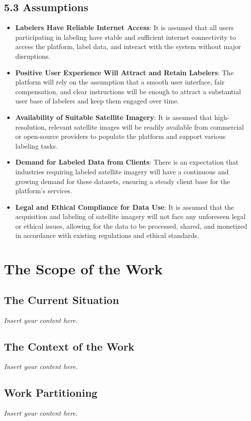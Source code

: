 \documentclass[12pt]{article}
\newcommand{\lips}{\textit{Insert your content here.}}
\begin{document}
\subsection*{5.3 Assumptions}
\begin{itemize}
    \item \textbf{Labelers Have Reliable Internet Access}: It is assumed that all users participating in labeling have stable and sufficient internet connectivity to access the platform, label data, and interact with the system without major disruptions.
    \item \textbf{Positive User Experience Will Attract and Retain Labelers}: The platform will rely on the assumption that a smooth user interface, fair compensation, and clear instructions will be enough to attract a substantial user base of labelers and keep them engaged over time.
    \item \textbf{Availability of Suitable Satellite Imagery}: It is assumed that high-resolution, relevant satellite images will be readily available from commercial or open-source providers to populate the platform and support various labeling tasks.
    \item \textbf{Demand for Labeled Data from Clients}: There is an expectation that industries requiring labeled satellite imagery will have a continuous and growing demand for these datasets, ensuring a steady client base for the platform’s services.
    \item \textbf{Legal and Ethical Compliance for Data Use}: It is assumed that the acquisition and labeling of satellite imagery will not face any unforeseen legal or ethical issues, allowing for the data to be processed, shared, and monetized in accordance with existing regulations and ethical standards.
\end{itemize}

\section{The Scope of the Work}
\subsection{The Current Situation}
\lips
\subsection{The Context of the Work}
\lips
\subsection{Work Partitioning}
\lips
\end{document}
